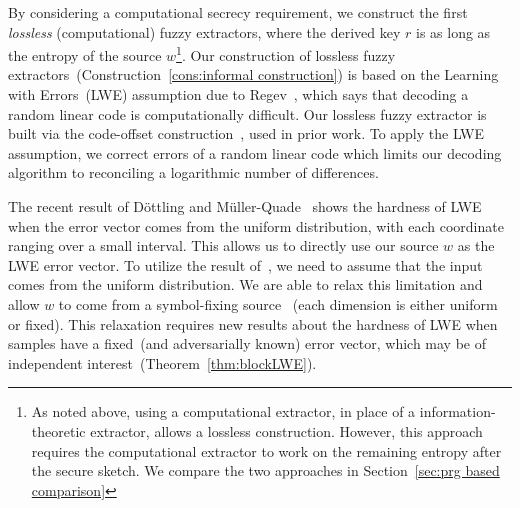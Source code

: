 \documentclass[11pt]{article}
\newcommand{\secref}[1]{\mbox{Section~\ref{#1}}}
\newcommand{\thref}[1]{\mbox{Theorem~\ref{#1}}}
\newcommand{\consref}[1]{\mbox{Construction~\ref{#1}}}
\newcommand{\class}[1]{{\ensuremath{\mathsf{#1}}}}
\newcommand{\gen}{\ensuremath{\class{Gen}}\xspace}
\newcommand{\authnote}[2]{{\textcolor{red}{\textsf{#1 notes: }\textcolor{blue}{ #2}}\marginpar{\textcolor{red}{\textbf{!!!!!}}}}}
\newcommand{\authnote}[2]{}
\newcommand{\lnote}[1]{{\authnote{Leo}{#1}}}
\begin{document}
By considering a computational secrecy requirement, we construct the first \emph{lossless} (computational) fuzzy extractors, where the derived key $r$ is as long as the entropy of the source $w$\footnote{As noted above, using a computational extractor, in place of a information-theoretic extractor, allows a lossless construction.  However, this approach requires the computational extractor to work on the remaining entropy after the secure sketch.  We compare the two approaches in \secref{sec:prg based comparison}}. %
Our construction of lossless fuzzy extractors~(\consref{cons:informal construction}) is based on the Learning with Errors~(LWE) assumption due to Regev~\cite{regev2005LWE, regevLWEsurvey},  which says that decoding a random linear code is computationally difficult.  
Our lossless fuzzy extractor is built via the code-offset construction~\cite{JW99},\cite[Section 5]{DBLP:journals/siamcomp/DodisORS08} used in prior work.  To apply the LWE assumption, we correct errors of a random linear code which limits our decoding algorithm to reconciling a logarithmic number of differences.  

The recent result of D\"{o}ttling and M\"{u}ller-Quade~\cite{dottling2012} shows the hardness of LWE when the error vector comes from the uniform distribution, with each coordinate ranging over a small interval.  This allows us to directly use our source $w$ as the LWE error vector.  To utilize the result of~\cite{dottling2012}, we need to assume that the input comes from the uniform distribution. We are able to relax this limitation and allow $w$ to come from a symbol-fixing source~\cite{KZ07} (each dimension is either uniform or fixed). This relaxation requires new results about the hardness of LWE when samples have a fixed~(and adversarially known) error vector, which may be of independent interest~(\thref{thm:blockLWE}).
\end{document}
